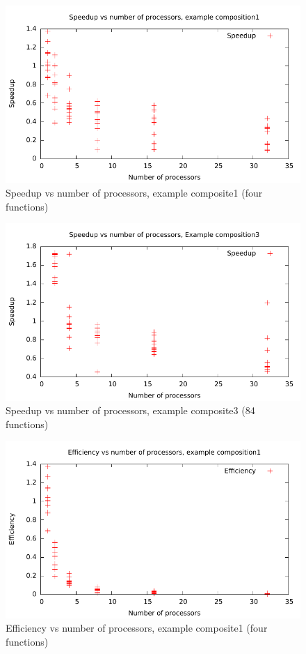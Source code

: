 \documentclass{acm_proc_article-sp}
\begin{document}
\begin{figure}[ht]
	\centering
	\includegraphics[scale=0.6]{../../data/composite1-speedup.pdf}
	\caption{Speedup vs number of processors, example composite1 (four
	functions)}
	\label{fig:c1s}
\end{figure}
\begin{figure}[ht]
	\centering
	\includegraphics[scale=0.6]{../../data/composite3-speedup.pdf}
	\caption{Speedup vs number of processors, example composite3 (84 functions)}
	\label{fig:c3s}
\end{figure}
\begin{figure}[ht]
	\centering
	\includegraphics[scale=0.6]{../../data/composite1-efficiency.pdf}
	\caption{Efficiency vs number of processors, example composite1 (four
	functions)}
	\label{fig:c1e}
\end{figure}
\end{document}
